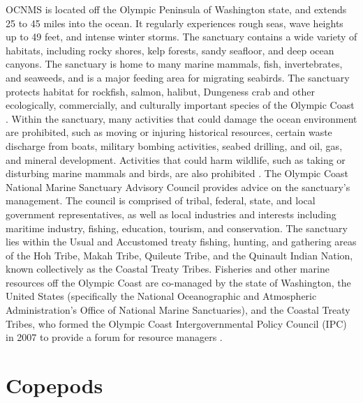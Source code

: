 \documentclass[12pt,twoside]{reedthesis}
\begin{document}
OCNMS is located off the Olympic Peninsula of Washington state, and extends 25 to 45 miles into the ocean. It regularly experiences rough seas, wave heights up to 49 feet, and intense winter storms. The sanctuary contains a wide variety of habitats, including rocky shores, kelp forests, sandy seafloor, and deep ocean canyons. The sanctuary is home to many marine mammals, fish, invertebrates, and seaweeds, and is a major feeding area for migrating seabirds. The sanctuary protects habitat for rockfish, salmon, halibut, Dungeness crab and other ecologically, commercially, and culturally important species of the Olympic Coast \autocite{OfficeofNationalMarineSanctuaries2022}.  Within the sanctuary, many activities that could damage the ocean environment are prohibited, such as moving or injuring historical resources, certain waste discharge from boats, military bombing activities, seabed drilling, and oil, gas, and mineral development. Activities that could harm wildlife, such as taking or disturbing marine mammals and birds, are also prohibited \autocite{15CFRPart1995}. The Olympic Coast National Marine Sanctuary Advisory Council provides advice on the sanctuary's management. The council is comprised of tribal, federal, state, and local government representatives, as well as local industries and interests including maritime industry, fishing, education, tourism, and conservation. The sanctuary lies within the Usual and Accustomed treaty fishing, hunting, and gathering areas of the Hoh Tribe, Makah Tribe, Quileute Tribe, and the Quinault Indian Nation, known collectively as the Coastal Treaty Tribes. Fisheries and other marine resources off the Olympic Coast are co-managed by the state of Washington, the United States (specifically the National Oceanographic and Atmospheric Administration's Office of National Marine Sanctuaries), and the Coastal Treaty Tribes, who formed the Olympic Coast Intergovernmental Policy Council (IPC) in 2007 to provide a forum for resource managers \autocite{IntergovernmentalPolicyCouncil}.


\section{Copepods}
\end{document}
